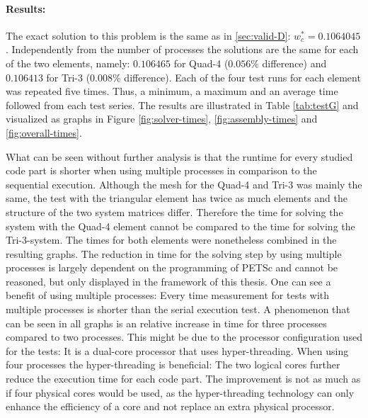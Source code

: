   \paragraph{Results:} The exact solution to this problem is the same as in \ref{sec:valid-D}: $w_c^* = 0.1064045$. Independently from the number of processes the solutions are the same for each of the two elements, namely: $0.106465$ for Quad-4 ($0.056\%$ difference) and $0.106413$ for Tri-3 ($0.008\%$ difference). Each of the four test runs for each element was repeated five times. Thus, a minimum, a maximum and an average time followed from each test series. The results are illustrated in Table \ref{tab:testG} and visualized as graphs in Figure \ref{fig:solver-times}, \ref{fig:assembly-times} and \ref{fig:overall-times}.
  
  What can be seen without further analysis is that the runtime for every studied code part is shorter when using multiple processes in comparison to the sequential execution. Although the mesh for the Quad-4 and Tri-3 was mainly the same, the test with the triangular element has twice as much elements and the structure of the two system matrices differ. Therefore the time for solving the system with the Quad-4 element cannot be compared to the time for solving the Tri-3-system. The times for both elements were nonetheless combined in the resulting graphs. The reduction in time for the solving step by using multiple processes is largely dependent on the programming of PETSc and cannot be reasoned, but only displayed in the framework of this thesis. One can see a benefit of using multiple processes: Every time measurement for tests with multiple processes is shorter than the serial execution test. A phenomenon that can be seen in all graphs is an relative increase in time for three processes compared to two processes. This might be due to the processor configuration used for the tests: It is a dual-core processor that uses hyper-threading. When using four processes the hyper-threading is beneficial: The two logical cores further reduce the execution time for each code part. The improvement is not as much as if four physical cores would be used, as the hyper-threading technology can only enhance the efficiency of a core and not replace an extra physical processor.
  

